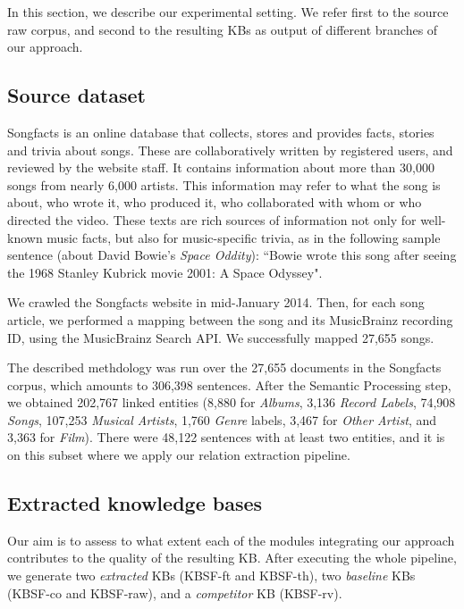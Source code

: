 In this section, we describe our experimental setting. We refer first to the source raw corpus, and second to the resulting KBs as output of different branches of our approach.


\subsection{Source dataset}\label{sec:kb:exp:dataset}

Songfacts is an online database that collects, stores and provides facts, stories and trivia about songs. These are collaboratively written by registered users, and reviewed by the website staff. It contains information about more than 30,000 songs from nearly 6,000 artists. This information may refer to what the song is about, who wrote it, who produced it, who collaborated with whom or who directed the video. These texts are rich sources of information not only for well-known music facts, but also for music-specific trivia, as in the following sample sentence (about David Bowie's \textit{Space Oddity}): ``Bowie wrote this song after seeing the 1968 Stanley Kubrick movie 2001: A Space Odyssey".

We crawled the Songfacts website in mid-January 2014. Then, for each song article, we performed a mapping between the song and its MusicBrainz recording ID, using the MusicBrainz Search API. We successfully mapped 27,655 songs.

The described methdology was run over the 27,655 documents in the Songfacts corpus, which amounts to 306,398 sentences. After the Semantic Processing step, we obtained 202,767 linked entities (8,880 for \textit{Albums}, 3,136 \textit{Record Labels}, 74,908 \textit{Songs}, 107,253 \textit{Musical Artists}, 1,760 \textit{Genre} labels, 3,467 for \textit{Other Artist}, and 3,363 for \textit{Film}). There were 48,122 sentences with at least two entities, and it is on this subset where we apply our relation extraction pipeline.


\subsection{Extracted knowledge bases}
\label{sec:kb:exp:learnedkbs}

Our aim is to assess to what extent each of the modules integrating our approach contributes to the quality of the resulting KB. After executing the whole pipeline, we generate two \textit{extracted} KBs (\textsc{KBSF}-ft and \textsc{KBSF}-th), two \textit{baseline} KBs (\textsc{KBSF}-co and \textsc{KBSF}-raw), and a \textit{competitor} KB (\textsc{KBSF}-rv). 

